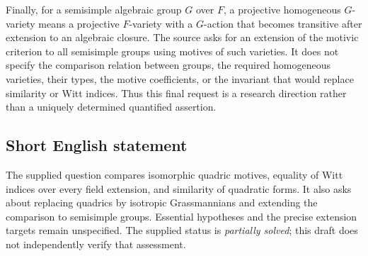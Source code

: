 \documentclass[11pt]{article}
\begin{document}
Finally, for a semisimple algebraic group \(G\) over \(F\), a projective homogeneous \(G\)-variety means a projective \(F\)-variety with a \(G\)-action that becomes transitive after extension to an algebraic closure. The source asks for an extension of the motivic criterion to all semisimple groups using motives of such varieties. It does not specify the comparison relation between groups, the required homogeneous varieties, their types, the motive coefficients, or the invariant that would replace similarity or Witt indices. Thus this final request is a research direction rather than a uniquely determined quantified assertion.
\subsection{Short English statement}
The supplied question compares isomorphic quadric motives, equality of Witt indices over every field extension, and similarity of quadratic forms. It also asks about replacing quadrics by isotropic Grassmannians and extending the comparison to semisimple groups. Essential hypotheses and the precise extension targets remain unspecified. The supplied status is \emph{partially solved}; this draft does not independently verify that assessment.
\end{document}
